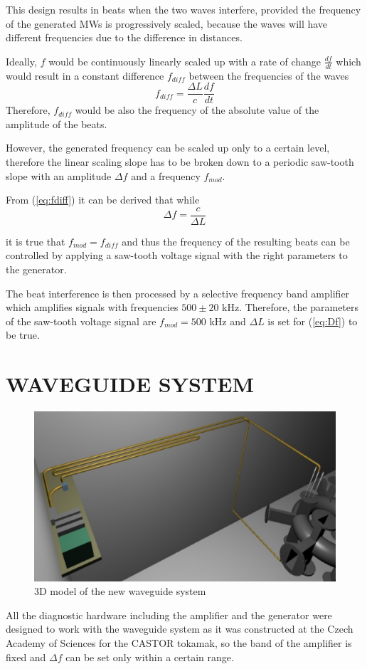 \documentclass[a4paper,twoside]{articlek}
\begin{document}
This design results in beats when the two waves interfere, provided the frequency of the generated MWs is progressively scaled, because the waves will have different frequencies due to the difference in distances. 

Ideally, $f$ would be continuously linearly scaled up with a rate of change $\frac{df}{dt}$ which would result in a constant difference $f_{diff}$ between the frequencies of the waves 
\begin{equation}
f_{diff}=\frac{\Delta L}{c} \frac{df}{dt}
\label{eq:fdiff}
\end{equation}
 Therefore, $f_{diff}$ would be also the frequency of the absolute value of the amplitude of the beats.

However, the generated frequency can be scaled up only to a certain level, therefore the linear scaling slope has to be broken down to a periodic saw-tooth slope with an amplitude $\Delta f$ and a frequency $f_{mod}$.

From (\ref{eq:fdiff}) it can be derived that while 
\begin{equation}
\Delta f=\frac{c}{\Delta L}
\label{eq:Df}
\end{equation}

it is true that $f_{mod}=f_{diff}$ and thus the frequency of the resulting beats can be controlled by applying a saw-tooth voltage signal with the right parameters to the generator. 

The beat interference is then processed by a selective frequency band amplifier which amplifies signals with frequencies $500 \pm 20$ kHz. Therefore, the parameters of the saw-tooth voltage signal are $f_{mod}=500$ kHz and $\Delta L$ is set for (\ref{eq:Df}) to be true.

\section{WAVEGUIDE SYSTEM}
\begin{figure}[b]
    \begin{center}
        \includegraphics[width=.45\textwidth]{vlnovody.eps}
    \end{center}
    \caption{3D model of the new waveguide system}
    \label{fig:ws}
\end{figure}
All the diagnostic hardware including the amplifier and the generator were designed to work with the waveguide system as it was constructed at the Czech Academy of Sciences for the CASTOR tokamak, so the band of the amplifier is fixed and $\Delta f$ can be set only within a certain range.
\end{document}

